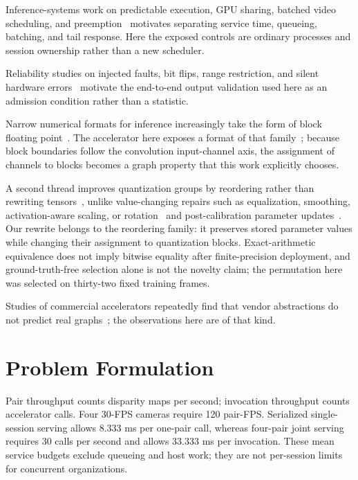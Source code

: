 \documentclass[sigconf,review,anonymous]{acmart}
\begin{document}
Inference-systems work on predictable execution, GPU sharing, batched video scheduling, and preemption~\cite{clockwork,salus,nexus,prema,planaria,rbq_jeong2022band,rbq_han2024pantheon} motivates separating service time, queueing, batching, and tail response. Here the exposed controls are ordinary processes and session ownership rather than a new scheduler.

Reliability studies on injected faults, bit flips, range restriction, and silent hardware errors~\cite{li2017dnnresilience,zheng2025save,rbq_chen2021ranger,rbq_hochschild2021cores} motivate the end-to-end output validation used here as an admission condition rather than a statistic.

Narrow numerical formats for inference increasingly take the form of block floating point~\cite{rbq_rouhani2020msfp,rbq_rouhani2023microscaling,rbq_ocp2023mx,rbq_zhang2022fast,rbq_lee2025mxplus}. The accelerator here exposes a format of that family~\cite{rbq_amdquarkbfp16}; because block boundaries follow the convolution input-channel axis, the assignment of channels to blocks becomes a graph property that this work explicitly chooses.

A second thread improves quantization groups by reordering rather than rewriting tensors~\cite{rbq_yuan2023rptq,rbq_cheng2026permuquant,rbq_yao2026ocgquant,rbq_pool2021permutations}, unlike value-changing repairs such as equalization, smoothing, activation-aware scaling, or rotation~\cite{rbq_nagel2019dfq,rbq_xiao2023smoothquant,rbq_lin2024awq,rbq_ashkboos2024quarot} and post-calibration parameter updates~\cite{rbq_nagel2020adaround,rbq_nagel2019dfq}. Our rewrite belongs to the reordering family: it preserves stored parameter values while changing their assignment to quantization blocks. Exact-arithmetic equivalence does not imply bitwise equality after finite-precision deployment, and ground-truth-free selection alone is not the novelty claim; the permutation here was selected on thirty-two fixed training frames.

Studies of commercial accelerators repeatedly find that vendor abstractions do not predict real graphs~\cite{rbq_hadidi2019characterizing,rbq_zhang2021nnmeter,rbq_seshadri2022edgetpu,rbq_park2026lens}; the observations here are of that kind.

\section{Problem Formulation}
\label{sec:prob}
Pair throughput counts disparity maps per second; invocation throughput counts accelerator calls. Four 30-FPS cameras require 120 pair-FPS. Serialized single-session serving allows 8.333 ms per one-pair call, whereas four-pair joint serving requires 30 calls per second and allows 33.333 ms per invocation. These mean service budgets exclude queueing and host work; they are not per-session limits for concurrent organizations.
\end{document}
